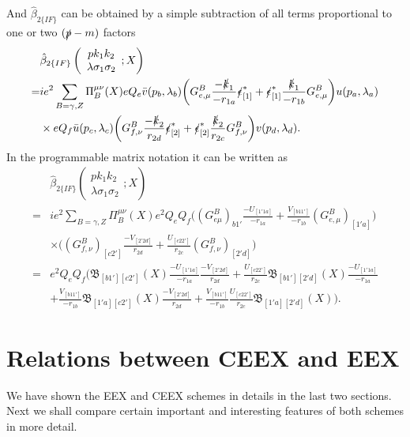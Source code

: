 And $\hat{\beta}_{2\{IF\}}$ can be obtained by a simple subtraction of all terms proportional to one or two $(\slashed p-m)$ factors
\begin{align}
&\hat{\beta}_{2\{IF\}}\left(\begin{array}{c}
pk_1k_2\\\lambda\sigma_1\sigma_2
\end{array};X\right)\nonumber\\
=&ie^2\sum_{B=\gamma,Z}\Pi^{\mu\nu}_B(X)eQ_e\bar{v}(p_b,\lambda_b)\biggl(G^B_{e,\mu}\frac{-\slashed k_1}{-r_{1a}}\slashed\epsilon^\ast_{[1]}+\slashed\epsilon^\ast_{[1]}\frac{\slashed k_1}{-r_{1b}}G^B_{e,\mu}\biggr)u(p_a,\lambda_a)\nonumber\\
&\times eQ_f\bar{u}(p_c,\lambda_c)\biggl( G^B_{f,\nu}\frac{-\slashed k_2}{r_{2d}}\slashed\epsilon^\ast_{[2]}+\slashed\epsilon^\ast_{[2]}\frac{\slashed k_2}{r_{2c}}G^B_{f,\nu} \biggr)v(p_d,\lambda_d).
\end{align}
In the programmable matrix notation it can be written as
\begin{align}
&\hat{\beta}_{2\{IF\}}\left(\begin{array}{c}
pk_1k_2\\\lambda\sigma_1\sigma_2
\end{array};X\right)\nonumber\\
=&ie^2\sum_{B=\gamma,Z}\Pi^{\mu\nu}_B(X)e^2Q_eQ_f\biggl( (G^B_{e\mu})_{b1'}\frac{-U_{[1'1a]}}{-r_{1a}}+\frac{V_{[b11']}}{-r_{1b}}(G^B_{e,\mu})_{[1'a]} \biggr)\nonumber\\
&\times\biggl( (G^B_{f,\nu})_{[c2']}\frac{-V_{[2'2d]}}{r_{2d}}+\frac{U_{[c22']}}{r_{2c}}(G^B_{f,\nu})_{[2'd]} \biggr)\nonumber\\
=&e^2Q_eQ_f\biggl( \mathfrak{B}_{[b1'][c2']}(X)\frac{-U_{[1'1a]}}{-r_{1a}}\frac{-V_{[2'2d]}}{r_{2d}}+\frac{U_{[c22']}}{r_{2c}}\mathfrak{B}_{[b1'][2'd]}(X)\frac{-U_{[1'1a]}}{-r_{1a}}\nonumber\\
&+\frac{V_{[b11']}}{-r_{1b}}\mathfrak{B}_{[1'a][c2']}(X)\frac{-V_{[2'2d]}}{r_{2d}}+\frac{V_{[b11']}}{-r_{1b}}\frac{U_{[c22']}}{r_{2c}}\mathfrak{B}_{[1'a][2'd]}(X) \biggr).
\end{align}

\section{Relations between CEEX and EEX}
We have shown the EEX and CEEX schemes in details in the last two sections. Next we shall compare certain important and interesting features of both schemes in more detail.

